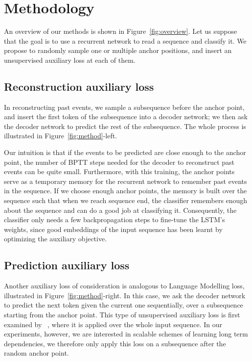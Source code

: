 \documentclass{article}
\begin{document}
\section{Methodology}

An overview of our methods is shown in Figure~\ref{fig:overview}. Let us suppose that the goal is to use a recurrent network to read a sequence and classify it. We propose to randomly sample one or multiple anchor positions, and insert an unsupervised auxiliary loss at each of them.

\subsection{Reconstruction auxiliary loss}

In reconstructing past events, we sample a subsequence before the anchor point, and insert the first token of the subsequence into a decoder network; we then ask the decoder network to predict the rest of the subsequence. The whole process is illustrated in Figure~\ref{fig:method}-left.

Our intuition is that if the events to be predicted are close enough to the anchor point, the number of BPTT steps needed for the decoder to reconstruct past events can be quite small. Furthermore, with this training, the anchor points serve as a temporary memory for the recurrent network to remember past events in the sequence. If we choose enough anchor points, the memory is built over the sequence such that when we reach sequence end, the classifier remembers enough about the sequence and can do a good job at classifying it. Consequently, the classifier only needs a few backpropagation steps to fine-tune the LSTM's weights, since good embeddings of the input sequence has been learnt by optimizing the auxiliary objective.


\subsection{Prediction auxiliary loss}

Another auxiliary loss of consideration is analogous to Language Modelling loss, illustrated in Figure~\ref{fig:method}-right. In this case, we ask the decoder network to predict the next token given the current one sequentially, over a subsequence starting from the anchor point. This type of unsupervised auxiliary loss is first examined by ~\citet{dai2015semi}, where it is applied over the whole input sequence. In our experiments, however, we are interested in scalable schemes of learning long term dependencies, we therefore only apply this loss on a subsequence after the random anchor point.
\end{document}
